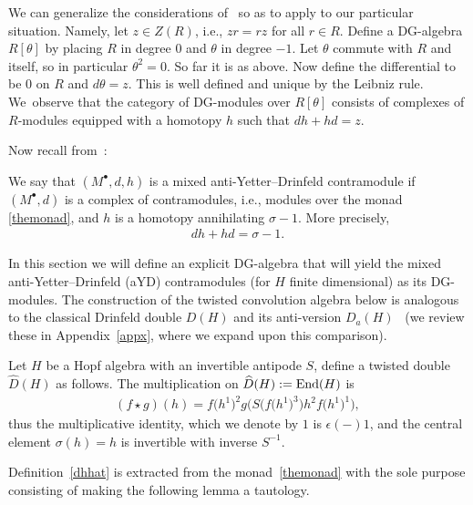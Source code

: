 \documentclass[pdftex]{sigma}
\numberwithin{equation}{section}
\begin{document}
We can generalize the considerations of~\cite{kassel} so as to apply to our particular situation. Namely, let $z\in Z(R)$, i.e., $zr=rz$ for all $r\in R$. Define a DG-algebra $R[\theta]$ by placing $R$ in degree $0$ and $\theta$ in degree $-1$. Let $\theta$ commute with $R$ and itself, so in particular $\theta^2=0$. So far it is as above. Now define the differential to be $0$ on $R$ and $d\theta=z$. This is well defined and unique by the Leibniz rule. We~observe that the category of DG-modules over $R[\theta]$ consists of complexes of $R$-modules equipped with a homotopy $h$ such that $dh+hd=z$.

Now recall from~\cite{chern}:

\begin{Definition}
We say that $(M^\bullet,d,h)$ is a mixed anti-Yetter--Drinfeld contramodule if $(M^\bullet,d)$ is a complex of contramodules, i.e., modules over the monad \eqref{themonad}, and $h$ is a homotopy annihilating $\sigma-1$. More precisely,
\begin{gather}
dh+hd=\sigma-1.
\end{gather}
\end{Definition}

In this section we will define an explicit DG-algebra that will yield the mixed anti-Yetter--Drinfeld (aYD) contramodules (for $H$ finite dimensional) as its DG-modules. The construction of the twisted convolution algebra below is analogous to the classical Drinfeld double $D(H)$ and its anti-version $D_a(H)$~\cite{HKRS2} (we review these in Appendix~\ref{appx}, where we expand upon this comparison).

\begin{Definition}\label{dhhat}
Let $H$ be a Hopf algebra with an invertible antipode $S$, define a twisted double~$\widehat{D}(H)$ as follows. The multiplication on $\widehat{D}(H):={\rm End}(H)$ is
\begin{gather}\label{mult}
(f\star g)(h)= f\big(h^1\big)^2g\big(S\big(f\big(h^1\big)^3\big)h^2f\big(h^1\big)^1\big),
\end{gather}
thus the multiplicative identity, which we denote by $1$ is $\epsilon(-)1$, and the central element $\sigma(h)=h$ is invertible with inverse $S^{-1}$.
\end{Definition}

Definition~\ref{dhhat} is extracted from the monad~\eqref{themonad} with the sole purpose consisting of making the following lemma a tautology.
\end{document}
